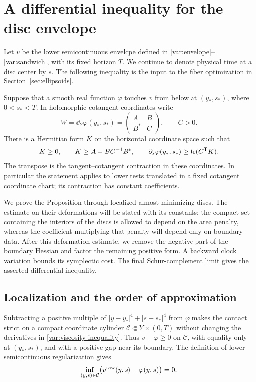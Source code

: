 \section{A differential inequality for the disc envelope}
\label{sec:variation}

Let $v$ be the lower semicontinuous envelope defined in
\eqref{var:envelope}--\eqref{var:sandwich}, with its fixed horizon $T$.
We continue to denote physical time at a disc center by $s$.
The following inequality is the input to the fiber optimization in
Section~\ref{sec:ellipsoids}.

\begin{proposition}
\label{prop:disc-inequality}
Suppose that a smooth real function $\varphi$ touches $v$ from below at
$(y_*,s_*)$, where $0<s_*<T$.  In holomorphic cotangent coordinates write
\[
 W=\dd_Y\varphi(y_*,s_*)=
 \begin{pmatrix} A&B\\ B^*&C\end{pmatrix},\qquad C>0.
\]
There is a Hermitian form $K$ on the horizontal coordinate space such that
\begin{equation}
 K\ge0,\qquad K\ge A-BC^{-1}B^*,\qquad
 \partial_s\varphi(y_*,s_*)\ge\operatorname{tr}(C^{\mathsf T}K).
 \label{var:viscosity-inequality}
\end{equation}
The transpose is the tangent--cotangent contraction in these coordinates.
In particular the statement applies to lower tests translated in a fixed
cotangent coordinate chart; its contraction has constant coefficients.
\end{proposition}

We prove the Proposition through localized almost minimizing discs.
The estimate on their deformations will be stated with its constants:
the compact set containing the interiors of the discs is allowed to
depend on the area penalty, whereas the coefficient multiplying that
penalty will depend only on boundary data.
After this deformation estimate, we remove the negative part of the
boundary Hessian and factor the remaining positive form.  A backward
clock variation bounds its symplectic cost.  The final Schur-complement
limit gives the asserted differential inequality.

\subsection{Localization and the order of approximation}

Subtracting a positive multiple of
$|y-y_*|^4+|s-s_*|^4$ from $\varphi$ makes the contact strict on a compact
coordinate cylinder $\mathcal C\Subset Y\times(0,T)$ without changing
the derivatives in \eqref{var:viscosity-inequality}.
Thus $v-\varphi\ge0$ on $\mathcal C$, with equality only
at $(y_*,s_*)$, and with a positive gap near its boundary.  The definition
of lower semicontinuous regularization gives
\[
 \inf_{(y,s)\in\mathcal C}\bigl(v^{\rm raw}(y,s)-\varphi(y,s)\bigr)=0.
\]

